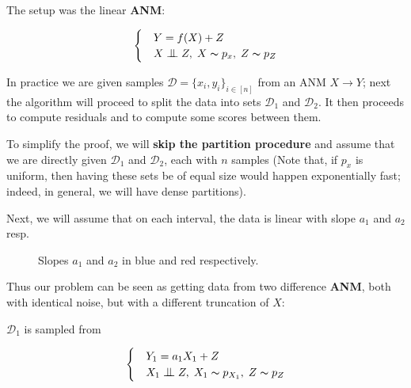 The setup was the linear \textbf{ANM}:

\[ \begin{cases} 
    & Y = f(X) + Z  \\
    & X \bigCI Z,\; X \thicksim p_x,\; Z \thicksim p_{Z}  
 \end{cases}
\]

In practice we are given samples $\mathcal{D} = \{x_i, y_i\}_{i \in [n]}$ from an ANM $X \rightarrow Y$; next 
the algorithm will proceed to split the data into sets $\mathcal{D}_1$ and $\mathcal{D}_2$. It then proceeds 
to compute residuals and to compute some scores between them.

To simplify the proof, we will \textbf{skip the partition procedure} and assume that
we are directly given $\mathcal{D}_1$ and $\mathcal{D}_2$, each with 
$n$ samples (Note that, if $p_x$ is uniform, then having these sets be of equal size would happen exponentially 
fast; indeed, in general, we will have dense partitions). 

Next, we will assume that on each interval, the data is linear with slope $a_1$ and $a_2$ resp. 

\begin{figure}[!h]
    \centering
      \caption{Slopes $a_1$ and $a_2$ in blue and red respectively.}
\end{figure}

Thus our problem can be seen as getting data from two difference \textbf{ANM}, both with identical noise, but with 
a different truncation of $X$:

$\mathcal{D}_1$ is sampled from 

\[ \begin{cases} 
    & Y_1 = a_1 X_1 + Z  \\
    & X_1 \bigCI Z,\; X_1 \thicksim p_{X_1},\; Z \thicksim p_{Z}  
 \end{cases}
\]

